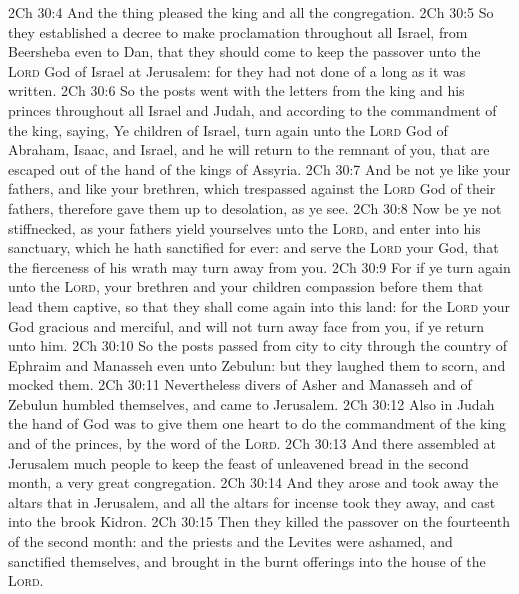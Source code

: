 \vs 2Ch 30:4 And the thing pleased the king and all the congregation.
\vs 2Ch 30:5 So they established a decree to make proclamation throughout all Israel, from Beersheba even to Dan, that they should come to keep the passover unto the \textsc{Lord} God of Israel at Jerusalem: for they had not done  of a long  as it was written.
\vs 2Ch 30:6 So the posts went with the letters from the king and his princes throughout all Israel and Judah, and according to the commandment of the king, saying, Ye children of Israel, turn again unto the \textsc{Lord} God of Abraham, Isaac, and Israel, and he will return to the remnant of you, that are escaped out of the hand of the kings of Assyria.
\vs 2Ch 30:7 And be not ye like your fathers, and like your brethren, which trespassed against the \textsc{Lord} God of their fathers,  therefore gave them up to desolation, as ye see.
\vs 2Ch 30:8 Now be ye not stiffnecked, as your fathers  yield yourselves unto the \textsc{Lord}, and enter into his sanctuary, which he hath sanctified for ever: and serve the \textsc{Lord} your God, that the fierceness of his wrath may turn away from you.
\vs 2Ch 30:9 For if ye turn again unto the \textsc{Lord}, your brethren and your children  compassion before them that lead them captive, so that they shall come again into this land: for the \textsc{Lord} your God  gracious and merciful, and will not turn away  face from you, if ye return unto him.
\vs 2Ch 30:10 So the posts passed from city to city through the country of Ephraim and Manasseh even unto Zebulun: but they laughed them to scorn, and mocked them.
\vs 2Ch 30:11 Nevertheless divers of Asher and Manasseh and of Zebulun humbled themselves, and came to Jerusalem.
\vs 2Ch 30:12 Also in Judah the hand of God was to give them one heart to do the commandment of the king and of the princes, by the word of the \textsc{Lord}.
\vs 2Ch 30:13 And there assembled at Jerusalem much people to keep the feast of unleavened bread in the second month, a very great congregation.
\vs 2Ch 30:14 And they arose and took away the altars that  in Jerusalem, and all the altars for incense took they away, and cast  into the brook Kidron.
\vs 2Ch 30:15 Then they killed the passover on the fourteenth  of the second month: and the priests and the Levites were ashamed, and sanctified themselves, and brought in the burnt offerings into the house of the \textsc{Lord}.
